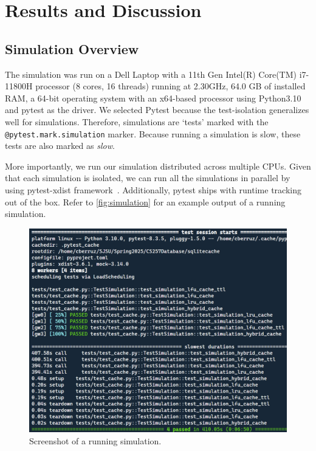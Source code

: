 
\section{Results and Discussion}
\subsection{Simulation Overview}
The simulation was run
on a Dell Laptop with a 11th Gen Intel(R) Core(TM) i7-11800H processor (8 cores, 16 threads)
running at 2.30GHz, 64.0 GB of installed RAM,
a 64-bit operating system with an x64-based processor
using Python3.10 and pytest as the driver.
We selected Pytest because the test-isolation generalizes
well for simulations. Therefore, simulations
are `tests' marked with the \texttt{@pytest.mark.simulation}
marker. Because running a simulation is slow,
these tests are also marked as \textit{slow}.

More importantly, we run our simulation
distributed across multiple CPUs. Given that
each simulation is isolated, we can run
all the simulations in parallel
by using pytest-xdist framework~\cite{pytestXdist}.
Additionally, pytest ships with runtime
tracking out of the box.
Refer to \autoref{fig:simulation}
for an example output of a running simulation.

\begin{figure}[!htp]
    \centering
    \includegraphics[width=\linewidth]{images/simulation_running_example.png}
    \caption{Screenshot of a running simulation.}
    \label{fig:simulation}
\end{figure}

